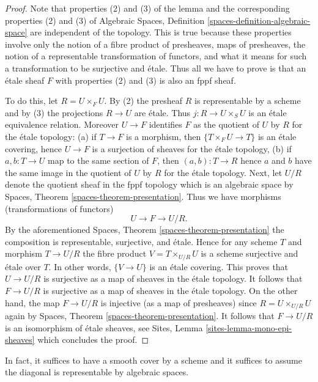 \begin{proof}
Note that properties (2) and (3) of the lemma and the corresponding
properties (2) and (3) of
Algebraic Spaces, Definition \ref{spaces-definition-algebraic-space}
are independent of the topology. This is true because these properties
involve only the notion of a fibre product of presheaves, maps of
presheaves, the notion of a representable transformation of functors,
and what it means for such a transformation to be surjective and \'etale.
Thus all we have to prove is that an \'etale sheaf $F$ with properties
(2) and (3) is also an fppf sheaf.

\medskip\noindent
To do this, let $R = U \times_F U$. By (2) the presheaf $R$ is representable
by a scheme and by (3) the projections $R \to U$ are \'etale. Thus
$j : R \to U \times_S U$ is an \'etale equivalence relation. Moreover
$U \to F$ identifies $F$ as the quotient of $U$ by $R$ for the
\'etale topology: (a) if $T \to F$ is a morphism, then $\{T \times_F U \to T\}$
is an \'etale covering, hence $U \to F$ is a surjection of sheaves for the
\'etale topology, (b) if $a, b : T \to U$ map to the same section of $F$,
then $(a, b) : T \to R$ hence $a$ and $b$ have the same image in the quotient
of $U$ by $R$ for the \'etale topology. Next, let $U/R$ denote the quotient
sheaf in the fppf topology which is an algebraic space by
Spaces, Theorem \ref{spaces-theorem-presentation}.
Thus we have morphisms (transformations of functors)
$$
U \to F \to U/R.
$$
By the aforementioned
Spaces, Theorem \ref{spaces-theorem-presentation}
the composition is representable, surjective, and \'etale. Hence for any
scheme $T$ and morphism $T \to U/R$ the fibre product $V = T \times_{U/R} U$
is a scheme surjective and \'etale over $T$. In other words, $\{V \to U\}$
is an \'etale covering. This proves that $U \to U/R$ is surjective as
a map of sheaves in the \'etale topology. It follows that
$F \to U/R$ is surjective as a map of sheaves in the \'etale topology.
On the other hand, the map $F \to U/R$ is injective (as a map of presheaves)
since $R = U \times_{U/R} U$ again by
Spaces, Theorem \ref{spaces-theorem-presentation}.
It follows that $F \to U/R$ is an isomorphism of \'etale sheaves, see
Sites, Lemma \ref{sites-lemma-mono-epi-sheaves}
which concludes the proof.
\end{proof}

\noindent
In fact, it suffices to have a smooth cover by a scheme and it suffices
to assume the diagonal is representable by algebraic spaces.

